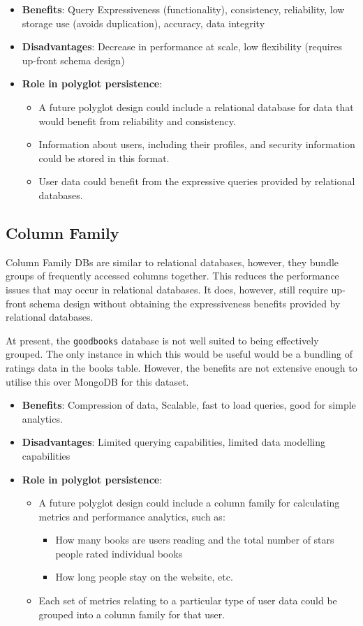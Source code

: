 \documentclass[11pt]{article}
\begin{document}
\begin{itemize}
\item \textbf{Benefits}: Query Expressiveness (functionality), consistency, reliability, low storage use (avoids duplication), accuracy, data integrity
\item \textbf{Disadvantages}: Decrease in performance at scale, low flexibility (requires up-front schema design)
\item \textbf{Role in polyglot persistence}:
\begin{itemize}
\item A future polyglot design could include a relational database for data that would benefit from reliability and consistency.
\item Information about users, including their profiles, and security information could be stored in this format.
\item User data could benefit from the expressive queries provided by relational databases.
\end{itemize}
\end{itemize}
\subsection{Column Family}
\label{sec:org56fba81}
Column Family DBs are similar to relational databases, however, they bundle groups of frequently accessed columns together. This reduces the performance issues that may occur in relational databases. It does, however, still require up-front schema design without obtaining the expressiveness benefits provided by relational databases.\\
\linebreak

At present, the \texttt{goodbooks} database is not well suited to being effectively grouped. The only instance in which this would be useful would be a bundling of ratings data in the books table. However, the benefits are not extensive enough to utilise this over MongoDB for this dataset.

\begin{itemize}
\item \textbf{Benefits}: Compression of data, Scalable, fast to load queries, good for simple analytics.
\item \textbf{Disadvantages}: Limited querying capabilities, limited data modelling capabilities
\item \textbf{Role in polyglot persistence}:
\begin{itemize}
\item A future polyglot design could include a column family for calculating metrics and performance analytics, such as:
\begin{itemize}
\item How many books are users reading and the total number of stars people rated individual books
\item How long people stay on the website, etc.
\end{itemize}
\item Each set of metrics relating to a particular type of user data could be grouped into a column family for that user.
\end{itemize}
\end{itemize}
\end{document}
